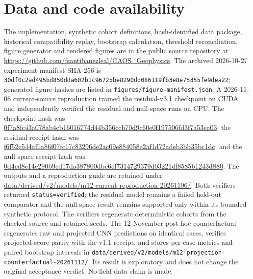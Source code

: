 \documentclass[11pt]{article}
\begin{document}
\section*{Data and code availability}
The implementation, synthetic cohort definitions, hash-identified data package, historical compatibility replay, bootstrap calculation, threshold reconciliation, figure generator and rendered figures are in the public source repository at \url{https://github.com/fsantibanezleal/CAOS_Geophysics}. The archived 2026-10-27 experiment-manifest SHA-256 is \texttt{30df0c2ad495bd850dda602b1c96725be8290dd086119fb3e8e75355fe9dea22}; generated figure hashes are listed in \texttt{figures/figure-manifest.json}. A 2026-11-06 current-source reproduction trained the residual-v3.1 checkpoint on CUDA and independently verified the residual and null-space runs on CPU. The checkpoint hash was \url{0f7a8fc43a078ab4cb16016774d44b356ccb70d9c60e0f197506fd3f7a53ea03}; the residual receipt hash was \url{f6f52c544af1a86f07fc17c83296de2ac09e884058e2af1d72adeb3bb35bc1dc}; and the null-space receipt hash was \url{0d4cd8c14e290b9cd17da387800dbe6cf7314729379d03221df8585b1243d880}. The outputs and a reproduction guide are retained under \url{data/derived/v2/models/m12-current-reproduction-20261106/}. Both verifiers returned \texttt{status=verified}; the residual model remains a failed held-out comparator and the null-space result remains supported only within its bounded synthetic protocol. The verifiers regenerate deterministic cohorts from the checked source and retained seeds. The 12 November post-hoc counterfactual regenerates raw and projected CNN predictions on identical cases, verifies projected-score parity with the v1.1 receipt, and stores per-case metrics and paired bootstrap intervals in \texttt{data/derived/v2/models/m12-projection-counterfactual-20261112/}. Its result is exploratory and does not change the original acceptance verdict. No field-data claim is made.
\end{document}
